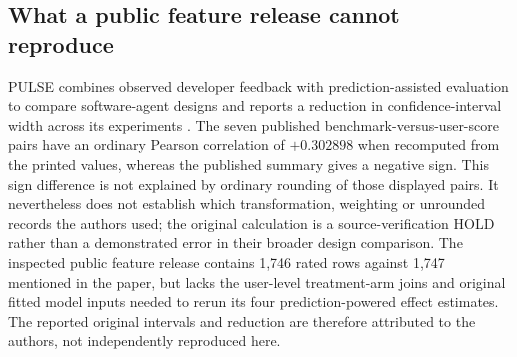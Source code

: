 \subsection{What a public feature release cannot reproduce}
PULSE combines observed developer feedback with prediction-assisted evaluation to compare software-agent designs and reports a reduction in confidence-interval width across its experiments \cite{ref36}. The seven published benchmark-versus-user-score pairs have an ordinary Pearson correlation of $+0.302898$ when recomputed from the printed values, whereas the published summary gives a negative sign. This sign difference is not explained by ordinary rounding of those displayed pairs. It nevertheless does not establish which transformation, weighting or unrounded records the authors used; the original calculation is a source-verification HOLD rather than a demonstrated error in their broader design comparison. The inspected public feature release contains 1,746 rated rows against 1,747 mentioned in the paper, but lacks the user-level treatment-arm joins and original fitted model inputs needed to rerun its four prediction-powered effect estimates. The reported original intervals and reduction are therefore attributed to the authors, not independently reproduced here.


